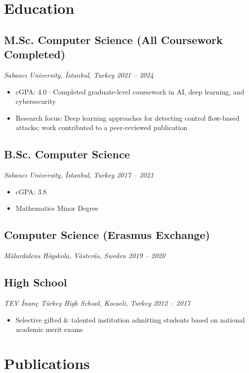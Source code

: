 \documentclass[a4paper,10pt]{article}
\begin{document}
\vspace{-0.5cm}
\section{Education}
\subsection{M.Sc. Computer Science (All Coursework Completed)}
\textit{Sabancı University, İstanbul, Turkey \hfill 2021 -- 2024}
\begin{itemize}[label=--,leftmargin=*]
    \item cGPA: 4.0 $\cdot$ Completed graduate-level coursework in AI, deep learning, and cybersecurity
    \item Research focus: Deep learning approaches for detecting control flow-based attacks; work contributed to a peer-reviewed publication
\end{itemize}

\subsection{B.Sc. Computer Science}
\textit{Sabancı University, İstanbul, Turkey \hfill 2017 -- 2021}
\begin{itemize}[label=--,leftmargin=*]
    \item cGPA: 3.8
    \item Mathematics Minor Degree
\end{itemize}

\subsection{Computer Science (Erasmus Exchange)}
\textit{Mälardalens Högskola, Västerås, Sweden \hfill 2019 -- 2020}

\subsection{High School}
\textit{TEV İnanç Türkeş High School, Kocaeli, Turkey \hfill 2012 -- 2017}
\begin{itemize}[label=--,leftmargin=*]
    \item Selective gifted \& talented institution admitting students based on national academic merit exams
\end{itemize}

\vspace{-0.5cm}
\section{Publications}
\end{document}
